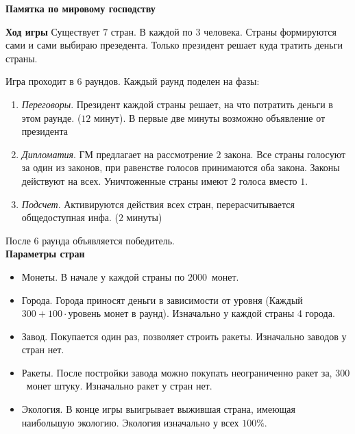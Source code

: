 \documentclass{article}
\begin{document}
\clearpage
\pagestyle{empty}
\begin{center}
	\bf Памятка по мировому господству
\end{center}
\textbf{Ход игры}
Существует $7$ стран. В каждой по $3$ человека. Страны формируются сами и сами выбираю презедента. Только президент решает куда тратить деньги страны.

Игра проходит в $6$ раундов. Каждый раунд поделен на фазы:
\begin{enumerate}
	\item \textit{Переговоры}. Президент каждой страны решает, на что потратить деньги в этом раунде. ($12$ минут). В первые две минуты возможно объявление от президента
	\item \textit{Дипломатия}. ГМ предлагает на рассмотрение $2$ закона. Все страны голосуют за один из законов, при равенстве голосов принимаются оба закона. Законы действуют на всех. Уничтоженные страны имеют $2$ голоса вместо $1$.
	\item \textit{Подсчет}. Активируются действия всех стран, перерасчитывается общедоступная инфа. ($2$ минуты)
\end{enumerate}
После 6 раунда объявляется победитель.\\
\textbf{Параметры стран}
\begin{itemize}
\item Монеты. В начале у каждой страны по $2000$~монет. 
\item Города. Города приносят деньги в зависимости от уровня (Каждый $300+100 \cdot \text{уровень} $ монет в раунд). Изначально у каждой страны 4 города.
\item Завод. Покупается один раз, позволяет строить ракеты. Изначально заводов у стран нет. %
\item Ракеты. После постройки завода можно покупать  неограниченно ракет за, $300$~монет штуку. Изначально ракет у стран нет.%
\item Экология. В конце игры выигрывает выжившая страна, имеющая наибольшую экологию. Экология изначально у всех $100\%$. %
\end{itemize}
\end{document}
